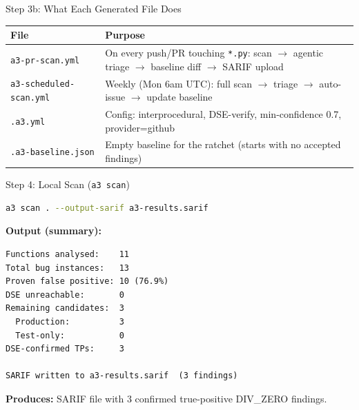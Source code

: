 \documentclass[aspectratio=169]{beamer}
\begin{document}
\begin{frame}{Step 3b: What Each Generated File Does}
\begin{table}[h]
\centering
\begin{tabular}{lp{9cm}}
\toprule
\textbf{File} & \textbf{Purpose} \\
\midrule
\texttt{a3-pr-scan.yml} & On every push/PR touching \texttt{*.py}: scan $\to$ agentic triage $\to$ baseline diff $\to$ SARIF upload \\
\texttt{a3-scheduled-scan.yml} & Weekly (Mon 6am UTC): full scan $\to$ triage $\to$ auto-issue $\to$ update baseline \\
\texttt{.a3.yml} & Config: interprocedural, DSE-verify, min-confidence 0.7, provider=github \\
\texttt{.a3-baseline.json} & Empty baseline for the ratchet (starts with no accepted findings) \\
\bottomrule
\end{tabular}
\end{table}
\end{frame}

\begin{frame}[fragile]{Step 4: Local Scan (\texttt{a3 scan})}
\begin{lstlisting}[language=bash]
a3 scan . --output-sarif a3-results.sarif
\end{lstlisting}

\textbf{Output (summary):}
\begin{lstlisting}
Functions analysed:    11
Total bug instances:   13
Proven false positive: 10 (76.9%)
DSE unreachable:       0
Remaining candidates:  3
  Production:          3
  Test-only:           0
DSE-confirmed TPs:     3

SARIF written to a3-results.sarif  (3 findings)
\end{lstlisting}

\textbf{Produces:} SARIF file with 3 confirmed true-positive DIV\_ZERO findings.
\end{frame}
\end{document}
